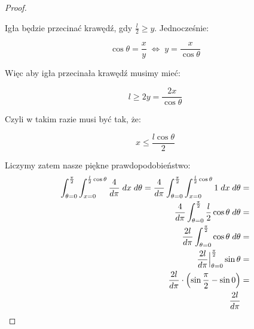 \begin{proof}
\begin{center}
	\end{center}

	Igła będzie przecinać krawędź, gdy \( \frac{l}{2} \geq y\). Jednocześnie:

	\[
		\cos{\theta} = \frac{x}{y} \; \iff \; y = \frac{x}{\cos{\theta}}
	\]

	Więc aby igła przecinała krawędź musimy mieć:

	\[
		l \geq 2y = \frac{2x}{\cos{\theta}}
	\]

	Czyli w takim razie musi być tak, że:

	\[
		x \leq \frac{l \cos{\theta}}{2}
	\]

	Liczymy zatem nasze piękne prawdopodobieństwo:
	\begin{align*}
		\int_{\theta=0}^{\frac{\pi}{2}} \int_{x=0}^{\frac{l}{2}\cos{\theta}} \frac{4}{d\pi} \; dx\; d\theta = \frac{4}{d\pi}  \int_{\theta=0}^{\frac{\pi}{2}} \int_{x=0}^{\frac{l}{2}\cos{\theta}} 1 \; dx \; d\theta & = \\
		\frac{4}{d\pi}  \int_{\theta=0}^{\frac{\pi}{2}} \frac{l}{2} \cos{\theta} \; d\theta                                                                                                                           & = \\
		\frac{2l}{d\pi}  \int_{\theta=0}^{\frac{\pi}{2}} \cos{\theta} \; d\theta                                                                                                                                      & = \\
		\frac{2l}{d\pi} \Big\rvert_{\theta=0}^{\frac{\pi}{2}} \sin{\theta}                                                                                                                                            & = \\
		\frac{2l}{d\pi} \cdot \left(\sin{\frac{\pi}{2}} - \sin{0}\right)                                                                                                                                                    & = \\
		\frac{2l}{d\pi}
	\end{align*}
\end{proof}
